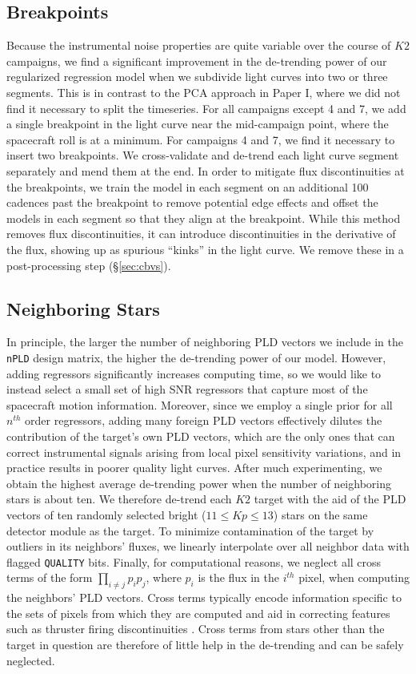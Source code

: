\documentclass[]{aastex62}
\newcommand{\Kp}{\ensuremath{Kp}}
\begin{document}
\subsection{Breakpoints}
\label{sec:impl_breakpoints}
Because the instrumental noise properties are quite variable over the course of $K2$
campaigns, we find a significant improvement in the de-trending power of our regularized
regression model when we subdivide light curves into two or three segments. This is in contrast to
the PCA approach in Paper I, where we did not find it necessary to split the timeseries.
For all campaigns except 4 and 7, we add a single breakpoint in the light curve near the
mid-campaign point, where the spacecraft roll is at a minimum. For campaigns 4 and 7,
we find it necessary to insert two breakpoints. We cross-validate and de-trend each
light curve segment separately and mend them at the end. In order to mitigate flux
discontinuities at the breakpoints, we train the model in each segment on an additional
100 cadences past the breakpoint to remove potential edge effects and offset the models
in each segment so that they align at the breakpoint.
While this method removes flux discontinuities, it can introduce discontinuities in the
derivative of the flux, showing up as spurious ``kinks'' in the light curve. We
remove these in a post-processing step (\S\ref{sec:cbvs}).

\subsection{Neighboring Stars}
\label{sec:impl_neighboring}
In principle, the larger the number of neighboring PLD vectors we include in the
\texttt{nPLD} design matrix, the higher the de-trending power of our model. However, adding
regressors significantly increases computing time, so we would like to instead select
a small set of high SNR regressors that capture most of the spacecraft
motion information. Moreover, since we employ a single prior for all $n^{th}$ order
regressors, adding many foreign PLD vectors effectively dilutes the contribution of
the target's own PLD vectors, which are the only ones that can correct instrumental
signals arising from local pixel sensitivity variations, and in practice results
in poorer quality light curves. After much experimenting, we obtain the highest average
de-trending power when the number of neighboring stars is about ten. We therefore de-trend
each $K2$ target with the aid of the PLD vectors of ten randomly selected bright
($11 \leq \Kp \leq 13$) stars on the same detector module as the target. To minimize
contamination of the target by outliers in its neighbors' fluxes, we linearly
interpolate over all neighbor data with flagged \texttt{QUALITY} bits. Finally, for
computational reasons, we neglect all cross terms of the form $\prod_{i \neq j} p_i p_j$,
where $p_i$ is the flux in the $i^{th}$ pixel,
when computing the neighbors' PLD vectors. Cross terms typically encode information
specific to the sets of pixels from which they are computed and aid in correcting
features such as thruster firing discontinuities \citep{Luger16}. Cross terms from
stars other than the target in question are therefore of little help in the de-trending
and can be safely neglected.
\end{document}
